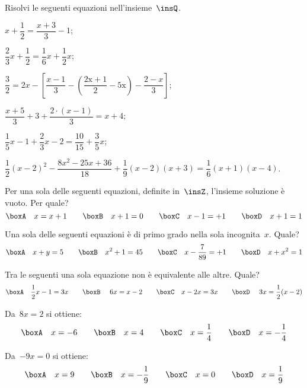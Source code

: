 \begin{esercizio}
\label{ese:15.43}%
Risolvi le seguenti equazioni nell'insieme~$\insQ$.
\begin{enumeratea}
\spazielenx
 \item $x+\dfrac{1}{2}=\dfrac{x+3}{3}-1$;
 \item $\dfrac{2}{3}x+\dfrac{1}{2}=\dfrac{1}{6}x+\dfrac{1}{2}x$;
 \item $\dfrac{3}{2}=2x-\left[\dfrac{x-1}{3}-\left(\dfrac{\text{2x}+1}{2}-\text{5x}\right)-\dfrac{2-x}{3}\right]$;
 \item $\dfrac{x+5}{3}+3+\dfrac{2\cdot \left(x-1\right)}{3}=x+4$;
 \item $\dfrac{1}{5}x-1+\dfrac{2}{3}x-2=\dfrac{10}{15}+\dfrac{3}{5}x$;
 \item $\dfrac{1}{2}(x-2)^{2}-\dfrac{8x^{2}-25x+36}{18}+\dfrac{1}{9}(x-2)(x+3)=\dfrac{1}{6}(x+1)(x-4)$.
\end{enumeratea}
\end{esercizio}

\begin{esercizio}
\label{ese:15.44}
Per una sola delle seguenti equazioni, definite in~$\insZ$, l'insieme soluzione è vuoto. Per quale?
\[\boxA\quad x=x+1\qquad\boxB\quad x+1=0\qquad\boxC\quad x-1=+1\qquad\boxD\quad x+1=1\]
\end{esercizio}

\begin{esercizio}
\label{ese:15.45}
Una sola delle seguenti equazioni è di primo grado nella sola incognita~$x$. Quale?
\[\boxA\quad x+y=5\qquad\boxB\quad x^{2}+1=45\qquad\boxC\quad x-\dfrac{7}{89}=+1\qquad\boxD\quad x+x^{2}=1\]
\end{esercizio}

\begin{esercizio}
\label{ese:15.46}
Tra le seguenti una sola equazione non è equivalente alle altre. Quale?
\[\boxA\quad \dfrac{1}{2}x-1=3x\qquad\boxB\quad~6x=x-2\qquad\boxC\quad x-2x=3x\qquad\boxD\quad~3x=\dfrac{1}{2}(x-2)\]
\end{esercizio}

\begin{esercizio}
\label{ese:15.47}
Da~$8x=2$ si ottiene:
\[\boxA\quad x=-6\qquad\boxB\quad x=4\qquad\boxC\quad x=\dfrac{1}{4}\qquad\boxD\quad x=-{\dfrac{1}{4}}\]
\end{esercizio}

\begin{esercizio}
\label{ese:15.48}
Da~$-9x=0$ si ottiene:
\[\boxA\quad x=9\qquad\boxB\quad x=-{\dfrac{1}{9}}\qquad\boxC\quad x=0\qquad\boxD\quad x=\dfrac{1}{9}\]
\end{esercizio}

